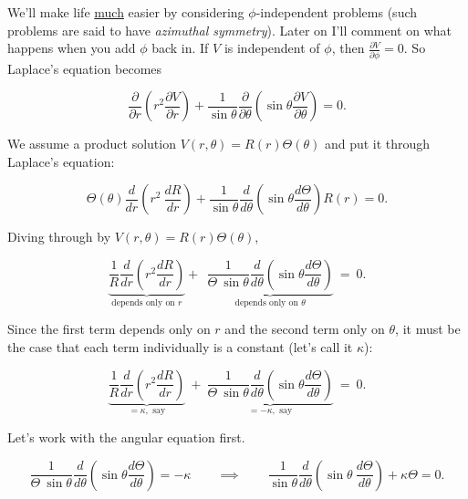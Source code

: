 \documentclass{article}
\numberwithin{equation}{section}
\begin{document}
We'll make life \underline{much} easier by considering $\phi$-independent problems (such problems are said to have \emph{azimuthal symmetry}). Later on I'll comment on what happens when you add $\phi$ back in. If $V$ is independent of $\phi$, then $\displaystyle \frac{\partial V}{\partial \phi} = 0$. So Laplace's equation becomes

\begin{equation*}
    \frac{\partial}{\partial r} \left( r^2 \frac{\partial V}{\partial r} \right) + \frac{1}{\sin{\theta}} \frac{\partial}{\partial \theta} \left( \sin{\theta} \frac{\partial V}{\partial \theta} \right) = 0.
\end{equation*}

We assume a product solution $\displaystyle V(r,\theta) = R(r) \Theta(\theta)$ and put it through Laplace's equation:

\begin{equation*}
    \Theta(\theta) \frac{d}{dr} \left( r^2\ \frac{dR}{dr} \right) + \frac{1}{\sin{\theta}} \frac{d}{d\theta} \left( \sin{\theta} \frac{d\Theta}{d\theta} \right) R(r) = 0.
\end{equation*}

Diving through by $V(r, \theta) = R(r)\Theta(\theta)$,

\begin{equation*}
    \underbrace{\frac{1}{R} \frac{d}{dr} \left( r^2 \frac{dR}{dr} \right)}_{\displaystyle \text{depends only on } r} + \ \ \underbrace{\frac{1}{\Theta\ \sin{\theta}} \frac{d}{d\theta} \left( \sin{\theta} \frac{d\Theta}{d\theta} \right)}_{\displaystyle \text{depends only on } \theta} \ = \ 0.
\end{equation*}

Since the first term depends only on $r$ and the second term only on $\theta$, it must be the case that each term individually is a constant (let's call it $\kappa$):

\begin{equation*}
    \underbrace{\frac{1}{R} \frac{d}{dr} \left( r^2 \frac{dR}{dr} \right)}_{\displaystyle = \kappa, \text{ say}} \ + \ \underbrace{\frac{1}{\Theta\ \sin{\theta}} \frac{d}{d\theta} \left( \sin{\theta} \frac{d\Theta}{d\theta} \right)}_{\displaystyle = -\kappa, \text{ say}} \ = \ 0.
\end{equation*}

Let's work with the angular equation first.

\begin{equation*}
    \frac{1}{\Theta\ \sin{\theta}} \frac{d}{d\theta} \left( \sin{\theta} \frac{d\Theta}{d\theta} \right) = -\kappa \qquad \implies \qquad \frac{1}{\sin{\theta}} \frac{d}{d\theta} \left( \sin{\theta}\ \frac{d\Theta}{d\theta} \right) + \kappa \Theta = 0.
\end{equation*}
\end{document}
